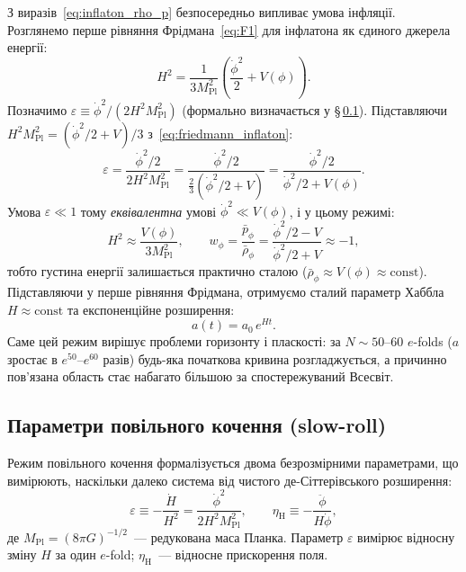 \documentclass[12pt, a4paper]{article}
\begin{document}
З виразів~\eqref{eq:inflaton_rho_p} безпосередньо випливає умова
інфляції. Розглянемо перше рівняння Фрідмана~\eqref{eq:F1} для
інфлатона як єдиного джерела енергії:
\begin{equation}\label{eq:friedmann_inflaton}
  H^2 = \frac{1}{3M_\mathrm{Pl}^2}
        \left(\frac{\dot\phi^2}{2} + V(\phi)\right).
\end{equation}
Позначимо $\varepsilon \equiv \dot\phi^2/(2H^2 M_\mathrm{Pl}^2)$
(формально визначається у §\,\ref{subsec:slowroll}).
Підставляючи $H^2 M_\mathrm{Pl}^2 = (\dot\phi^2/2 + V)/3$
з~\eqref{eq:friedmann_inflaton}:
\begin{equation*}
  \varepsilon
    = \frac{\dot\phi^2/2}{2H^2 M_\mathrm{Pl}^2}
    = \frac{\dot\phi^2/2}{\tfrac{2}{3}(\dot\phi^2/2 + V)}
    = \frac{\dot\phi^2/2}{\dot\phi^2/2 + V(\phi)}.
\end{equation*}
Умова $\varepsilon \ll 1$ тому \emph{еквівалентна} умові
$\dot\phi^2 \ll V(\phi)$, і у цьому режимі:
\begin{equation*}
  H^2 \approx \frac{V(\phi)}{3M_\mathrm{Pl}^2}, \qquad
  w_\phi = \frac{\bar{p}_\phi}{\bar{\rho}_\phi}
         = \frac{\dot\phi^2/2 - V}{\dot\phi^2/2 + V} \approx -1,
\end{equation*}
тобто густина енергії залишається практично сталою
($\bar{\rho}_\phi \approx V(\phi) \approx \mathrm{const}$).
Підставляючи у перше рівняння Фрідмана, отримуємо
сталий параметр Хаббла $H \approx \mathrm{const}$ та
експоненційне розширення:
\begin{equation*}
  a(t) = a_0\,e^{Ht}.
\end{equation*}
Саме цей режим вирішує проблеми горизонту і пласкості: за $N \sim
50$--$60$ $e$-folds ($a$ зростає в $e^{50}$--$e^{60}$ разів)
будь-яка початкова кривина розгладжується, а причинно пов'язана
область стає набагато більшою за спостережуваний Всесвіт.

\subsection{Параметри повільного кочення (slow-roll)}
\label{subsec:slowroll}

Режим повільного кочення формалізується двома безрозмірними
параметрами, що вимірюють, наскільки далеко система від чистого
де-Сіттерівського розширення:
\begin{equation}\label{eq:slow_roll_def}
  \varepsilon \equiv -\frac{\dot H}{H^2}
             = \frac{\dot\phi^2}{2H^2 M_\mathrm{Pl}^2},
  \qquad
  \eta_{\mathrm{H}} \equiv -\frac{\ddot{\phi}}{H\dot{\phi}},
\end{equation}
де $M_\mathrm{Pl} = (8\pi G)^{-1/2}$~--- редукована маса Планка.
Параметр $\varepsilon$ вимірює відносну зміну $H$ за один $e$-fold;
$\eta_{\mathrm{H}}$~--- відносне прискорення поля.
\end{document}
